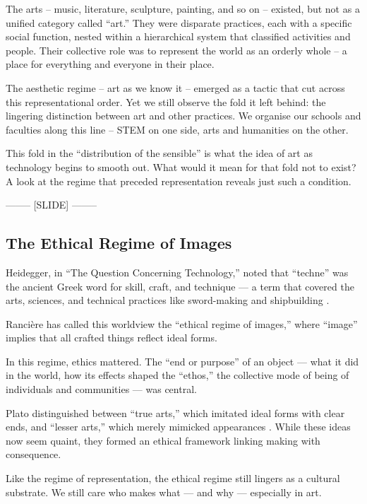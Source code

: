 \documentclass[letter:wpaper]{article}
\begin{document}
    The arts -- music, literature, sculpture, painting, and so on -- existed, but not as a unified category called ``art.'' They were disparate practices, each with a specific social function, nested within a hierarchical system that classified activities and people. Their collective role was to represent the world as an orderly whole -- a place for everything and everyone in their place.

    The aesthetic regime -- art as we know it -- emerged as a tactic that cut across this representational order. Yet we still observe the fold it left behind: the lingering distinction between art and other practices. We organise our schools and faculties along this line -- STEM on one side, arts and humanities on the other.

    This fold in the ``distribution of the sensible'' \citep[p.42]{RancierPltcsOfThAsthtcs2004} is what the idea of art as technology begins to smooth out. What would it mean for that fold not to exist? A look at the regime that preceded representation reveals just such a condition.

-------- [SLIDE] --------

    \subsection{The Ethical Regime of Images}

    Heidegger, in ``The Question Concerning Technology,'' noted that ``techne'' was the ancient Greek word for skill, craft, and technique — a term that covered the arts, sciences, and technical practices like sword-making and shipbuilding \citep[p.34]{HeideggerThQstnCncrngTchnlgy1954}.

    Rancière has called this worldview the ``ethical regime of images,'' where ``image'' implies that all crafted things reflect ideal forms.
    
    In this regime, ethics mattered. The ``end or purpose'' of an object — what it did in the world, how its effects shaped the ``ethos,'' the collective mode of being of individuals and communities  — was central. \citep[pp.20--21]{RancierPltcsOfThAsthtcs2004}
    
    Plato distinguished between ``true arts,'' which imitated ideal forms with clear ends, and ``lesser arts,'' which merely mimicked appearances \citep[p.20]{RancierPltcsOfThAsthtcs2004}. While these ideas now seem quaint, they formed an ethical framework linking making with consequence.
    
    Like the regime of representation, the ethical regime still lingers as a cultural substrate. We still care who makes what — and why — especially in art.
    
\end{document}
